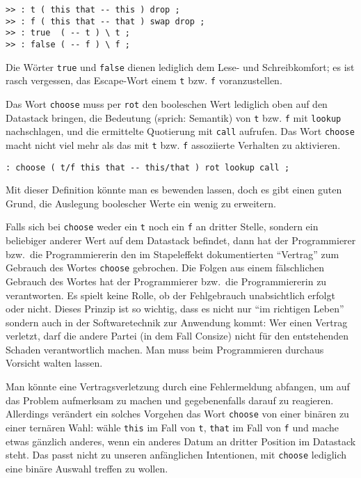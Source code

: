 \begin{verbatim}
>> : t ( this that -- this ) drop ;
>> : f ( this that -- that ) swap drop ;
>> : true  ( -- t ) \ t ;
>> : false ( -- f ) \ f ;
\end{verbatim}

Die Wörter \verb|true| und \verb|false| dienen lediglich dem Lese- und Schreibkomfort; es ist rasch vergessen, das Escape-Wort einem \verb|t| bzw. \verb|f| voranzustellen.

Das Wort \verb|choose| muss per \verb|rot| den booleschen Wert lediglich oben auf den Datastack bringen, die Bedeutung (sprich: Semantik) von \verb|t| bzw. \verb|f| mit \verb|lookup| nachschlagen, und die ermittelte Quotierung mit \verb|call| aufrufen. Das Wort \verb|choose| macht nicht viel mehr als das mit \verb|t| bzw. \verb|f| assoziierte Verhalten zu aktivieren.

\begin{verbatim}
: choose ( t/f this that -- this/that ) rot lookup call ;
\end{verbatim}

Mit dieser Definition könnte man es bewenden lassen, doch es gibt einen guten Grund, die Auslegung boolescher Werte ein wenig zu erweitern.

Falls sich bei \verb|choose| weder ein \verb|t| noch ein \verb|f| an dritter Stelle, sondern ein beliebiger anderer Wert auf dem Datastack befindet, dann hat der Programmierer bzw.\ die Programmiererin den im Stapeleffekt dokumentierten "`Vertrag"' zum Gebrauch des Wortes \verb|choose| gebrochen. Die Folgen aus einem fälschlichen Gebrauch des Wortes hat der Programmierer bzw.\ die Programmiererin zu verantworten. Es spielt keine Rolle, ob der Fehlgebrauch unabsichtlich erfolgt oder nicht. Dieses Prinzip ist so wichtig, dass es nicht nur "`im richtigen Leben"' sondern auch in der Softwaretechnik zur Anwendung kommt: Wer einen Vertrag verletzt, darf die andere Partei (in dem Fall Consize) nicht für den entstehenden Schaden verantwortlich machen. Man muss beim Programmieren durchaus Vorsicht walten lassen.

Man könnte eine Vertragsverletzung durch eine Fehlermeldung abfangen, um auf das Problem aufmerksam zu machen und gegebenenfalls darauf zu reagieren. Allerdings verändert ein solches Vorgehen das Wort \verb|choose| von einer binären zu einer ternären Wahl: wähle \verb|this| im Fall von \verb|t|, \verb|that| im Fall von \verb|f| und mache etwas gänzlich anderes, wenn ein anderes Datum an dritter Position im Datastack steht. Das passt nicht zu unseren anfänglichen Intentionen, mit \verb|choose| lediglich eine binäre Auswahl treffen zu wollen.

